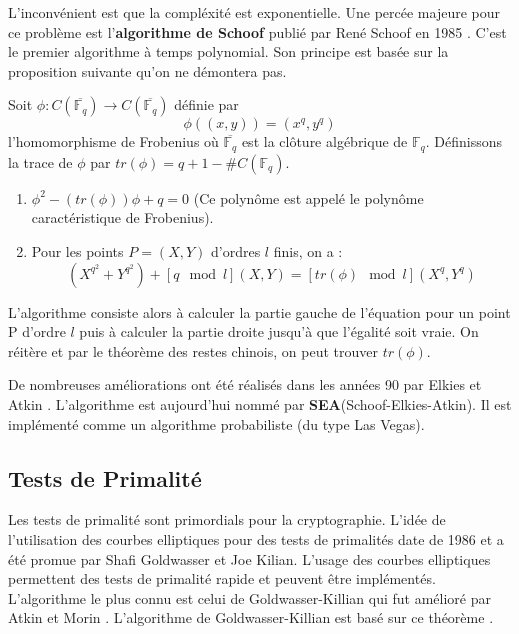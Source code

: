 \documentclass[a4paper]{article}
\begin{document}
\noindent L'inconvénient est que la compléxité est  exponentielle.
Une percée majeure pour ce problème est l'\textbf{algorithme de Schoof} publié par René Schoof en 1985 \cite{ref18}.
C'est le premier algorithme à temps polynomial.
Son principe est basée sur la proposition suivante qu'on ne démontera pas.
\begin{prop}
Soit $\phi : C(\overline{\mathbb{F}_{q}}) \rightarrow C(\overline{\mathbb{F}_{q}})$ définie par  
\begin{equation*}
\phi((x,y))=(x^q,y^q)
\end{equation*}
l'homomorphisme de Frobenius où $\overline{\mathbb{F}_{q}}$ est la clôture algébrique de $\mathbb{F}_{q}$.
Définissons la trace de $\phi$ par  $tr(\phi)=q+1-\# C(\mathbb{F}_{q})$.
\begin{enumerate} 
\item $\phi^2 - (tr(\phi))\phi+q=0$ (Ce polynôme est appelé le polynôme caractéristique de Frobenius).
\item Pour les points $P=(X,Y)$ d'ordres $l$ finis, on a : 
\begin{equation*}
(X^{q^2}+Y^{q^2})+ [q \mod l](X,Y)=[tr(\phi) \mod l](X^q,Y^q)
\end{equation*}
\end{enumerate}
\end{prop}
\noindent L’algorithme consiste alors à calculer la partie gauche de l’équation  pour un point P d’ordre $l$ puis à calculer la partie droite jusqu'à que l'égalité soit vraie. On réitère et par le théorème des restes chinois, on peut trouver $tr(\phi)$. 
\begin{rem}
De nombreuses améliorations ont été réalisés dans les années 90 par Elkies et Atkin \cite{ref19}. L'algorithme est aujourd'hui nommé par \textbf{SEA}(Schoof-Elkies-Atkin). Il est implémenté comme un algorithme probabiliste (du type Las Vegas).
\end{rem}


\subsection{Tests de Primalité}
\noindent Les tests de primalité sont primordials pour la cryptographie.
L'idée de l'utilisation des courbes elliptiques pour des tests de primalités date de 1986 et a été promue par Shafi Goldwasser et Joe Kilian. L'usage des courbes elliptiques permettent des tests de primalité rapide et peuvent être implémentés.
L'algorithme le plus connu est celui de Goldwasser-Killian qui fut amélioré par Atkin et Morin \cite{ref19}.
L'algorithme de Goldwasser-Killian est basé sur ce théorème  \cite{ref23}.
\end{document}
